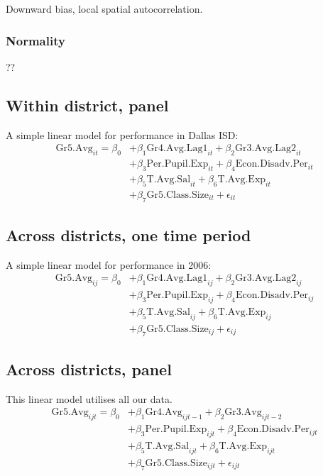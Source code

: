 \documentclass[11pt]{article}
\begin{document}
Downward bias, local spatial autocorrelation. 


\subsubsection{Normality}

??

\subsection{Within district, panel}
\label{ss:nextsub2}

A simple linear model for performance in Dallas ISD:
\begin{align*}
\mathrm{Gr5.Avg}_{it} = \beta_{0} 
    &+ \beta_{1}  \mathrm{Gr4.Avg.Lag1}_{it} 
    + \beta_{2}  \mathrm{Gr3.Avg.Lag2}_{it}    \\
    &+ \beta_{3}  \mathrm{Per.Pupil.Exp}_{it} 
    + \beta_{4}  \mathrm{Econ.Disadv.Per}_{it} \\
    &+ \beta_{5}  \mathrm{T.Avg.Sal}_{it}   
    + \beta_{6}  \mathrm{T.Avg.Exp}_{it}  \\
    &+ \beta_{7}  \mathrm{Gr5.Class.Size}_{it} + \epsilon_{it}
\end{align*}

\subsection{Across districts, one time period}
\label{ss:nextsub3}

A simple linear model for performance in 2006:
\begin{align*}
\mathrm{Gr5.Avg}_{ij} = \beta_{0} 
    &+ \beta_{1}  \mathrm{Gr4.Avg.Lag1}_{ij} 
    + \beta_{2}  \mathrm{Gr3.Avg.Lag2}_{ij}    \\
    &+ \beta_{3}  \mathrm{Per.Pupil.Exp}_{ij} 
    + \beta_{4}  \mathrm{Econ.Disadv.Per}_{ij} \\
    &+ \beta_{5}  \mathrm{T.Avg.Sal}_{ij}   
    + \beta_{6}  \mathrm{T.Avg.Exp}_{ij}  \\
    &+ \beta_{7}  \mathrm{Gr5.Class.Size}_{ij} + \epsilon_{ij}
\end{align*}

\subsection{Across districts, panel}
\label{ss:nextsub4}

This linear model utilises all our data.
\begin{align*}
\mathrm{Gr5.Avg}_{ijt} = \beta_{0} 
    &+ \beta_{1}  \mathrm{Gr4.Avg}_{ijt-1} 
    + \beta_{2}  \mathrm{Gr3.Avg}_{ijt-2}    \\
    &+ \beta_{3}  \mathrm{Per.Pupil.Exp}_{ijt} 
    + \beta_{4}  \mathrm{Econ.Disadv.Per}_{ijt} \\
    &+ \beta_{5}  \mathrm{T.Avg.Sal}_{ijt}   
    + \beta_{6}  \mathrm{T.Avg.Exp}_{ijt}  \\
    &+ \beta_{7}  \mathrm{Gr5.Class.Size}_{ijt} + \epsilon_{ijt}
\end{align*}
\end{document}
